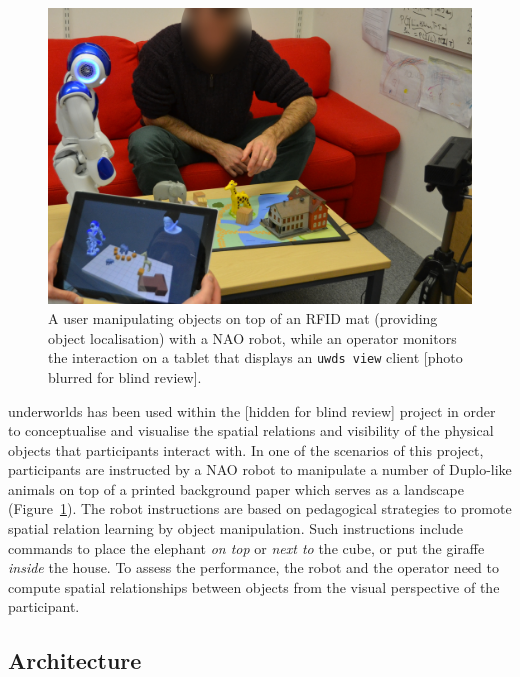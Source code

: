 \documentclass[conference]{IEEEtran}
\newcommand{\uwds}{{\sc underworlds}\xspace}
\begin{document}
\begin{figure}
    \centering
    \includegraphics[width=\linewidth]{l2tor-photo2-blind}
    \caption{A user manipulating objects on top of an RFID mat (providing object
    localisation) with a NAO robot, while an operator monitors
    the interaction on a tablet that displays an {\tt uwds view} client [photo blurred for blind review].}

    \label{fig|l2torexample}
\end{figure}

\uwds has been used within the [hidden for blind review] project
in order to conceptualise and visualise the spatial relations and visibility of
the physical objects that participants interact with. In one of the scenarios of this
project, participants are instructed by a NAO robot to manipulate a number of
Duplo-like animals on top of a printed background paper which serves as a
landscape (Figure~\ref{fig|l2torexample}). The robot instructions are based on
pedagogical strategies to promote spatial relation learning by object
manipulation. Such instructions include commands to place the elephant
\textit{on top} or \textit{next to} the cube, or put the giraffe \textit{inside}
the house.  To assess the performance, the robot and the operator need to
compute spatial relationships between objects from the visual perspective of the
participant.

\subsection*{Architecture}
\end{document}
